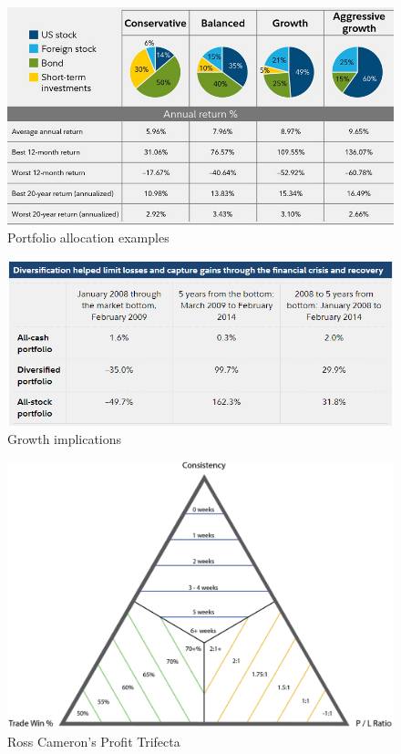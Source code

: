 \documentclass{article}
\begin{document}
\vspace{10pt}

\begin{figure}[!htb]
    \centering
    \includegraphics[width=\textwidth]{imgs/108.png}
    \caption{Portfolio allocation examples}
\end{figure}

\vspace{10pt}

\begin{figure}[!htb]
    \centering
    \includegraphics[width=\textwidth]{imgs/109.png}
    \caption{Growth implications}
\end{figure}

\vspace{10pt}

\begin{figure}[!htb]
    \centering
    \includegraphics[width=\textwidth]{imgs/110.png}
    \caption{Ross Cameron's Profit Trifecta}
\end{figure}
\end{document}
